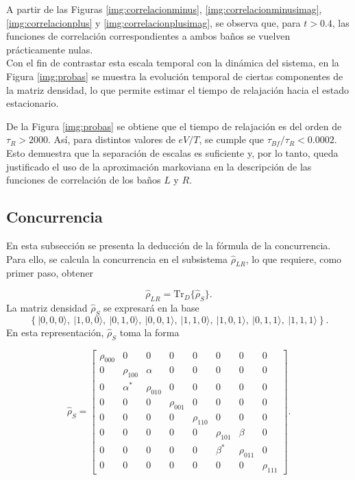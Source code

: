 \begin{appendixs}
A partir de las Figuras \ref{img:correlacionminus}, \ref{img:correlacionminusimag}, \ref{img:correlacionplus} y \ref{img:correlacionplusimag}, se observa que, para $t > 0.4$, las funciones de correlación correspondientes a ambos baños se vuelven prácticamente nulas.  
\\

Con el fin de contrastar esta escala temporal con la dinámica del sistema, en la Figura \ref{img:probas} se muestra la evolución temporal de ciertas componentes de la matriz densidad, lo que permite estimar el tiempo de relajación hacia el estado estacionario.  


De la Figura \ref{img:probas} se obtiene que el tiempo de relajación es del orden de $\tau_{R} > 2000$. Así, para distintos valores de $eV/T$, se cumple que $\tau_{Bf}/\tau_{R} < 0.0002$. Esto demuestra que la separación de escalas es suficiente y, por lo tanto, queda justificado el uso de la aproximación markoviana en la descripción de las funciones de correlación de los baños $L$ y $R$.  


\subsection{Concurrencia}
En esta subsección se presenta la deducción de la fórmula de la concurrencia. Para ello, se calcula la concurrencia en el subsistema $\hat{\rho}_{LR}$, lo que requiere, como primer paso, obtener  

\begin{equation*}
    \hat{\rho}_{LR} = \text{Tr}_{D}\{ \hat{\rho}_{S} \}.
\end{equation*}
La matriz densidad $\hat{\rho}_{S}$ se expresará en la base  
\[
\left\{ |0,0,0\rangle,\ |1,0,0\rangle,\ |0,1,0\rangle,\ |0,0,1\rangle,\ |1,1,0\rangle,\ |1,0,1\rangle,\ |0,1,1\rangle,\ |1,1,1\rangle \right\}.
\]
En esta representación, $\hat{\rho}_{S}$ toma la forma

\begin{equation}
    \hat{\rho}_{S} = 
    \begin{bmatrix}
        \rho_{000} & 0 & 0 & 0 & 0 & 0 & 0 & 0 \\
        0 & \rho_{100} & \alpha & 0 & 0 & 0 & 0 & 0 \\
        0 & \alpha^{*} & \rho_{010} & 0 & 0 & 0 & 0 & 0 \\
        0 & 0 & 0 & \rho_{001} & 0 & 0 & 0 & 0 \\
        0 & 0 & 0 & 0 & \rho_{110} & 0 & 0 & 0 \\
        0 & 0 & 0 & 0 & 0 & \rho_{101} & \beta & 0 \\
        0 & 0 & 0 & 0 & 0 & \beta^{*} & \rho_{011} & 0 \\
        0 & 0 & 0 & 0 & 0 & 0 & 0 & \rho_{111} 
        \end{bmatrix}.
        \label{appendix5rhoconcu}
\end{equation}


\end{appendixs}
